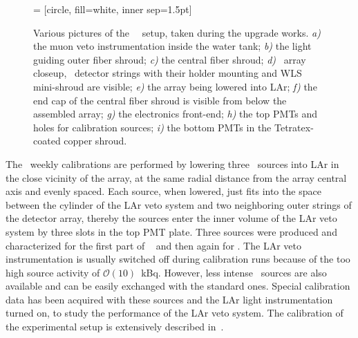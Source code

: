 \begin{figure}
   = [circle, fill=white, inner sep=1.5pt]
  \caption{%
    Various pictures of the \gerda\ \phasetwo\ setup, taken during the upgrade works.
    \emph{a)} the muon veto instrumentation inside the water tank; \emph{b)} the light
    guiding outer fiber shroud; \emph{c)} the central fiber shroud; \emph{d)} \phasetwo\
    array closeup, \bege\ detector strings with their holder mounting and WLS mini-shroud
    are visible; \emph{e)} the array being lowered into LAr; \emph{f)} the end cap of the
    central fiber shroud is visible from below the assembled array; \emph{g)} the
    electronics front-end; \emph{h)} the top PMTs and holes for calibration sources;
    \emph{i)} the bottom PMTs in the Tetratex\reg-coated copper shroud.
  }\label{fig:setup:pictures}
\end{figure}

The \gerda\ weekly calibrations are performed by lowering three \Th\ sources into LAr in
the close vicinity of the array, at the same radial distance from the array central axis
and evenly spaced. Each source, when lowered, just fits into the space between the
cylinder of the LAr veto system and two neighboring outer strings of the detector array,
thereby the sources enter the inner volume of the LAr veto system by three slots in the
top PMT plate.  Three sources were produced and characterized for the first part of
\phasetwo~\cite{Baudis2015} and then again for \phasetwop. The LAr veto instrumentation is
usually switched off during calibration runs because of the too high source activity of
$\mathcal{O}(10)$~kBq.  However, less intense \Ra\ sources are also available and can be
easily exchanged with the standard ones. Special calibration data has been acquired with
these sources and the LAr light instrumentation turned on, to study the performance of the
LAr veto system. The calibration of the experimental setup is extensively described
in~\cite{calib-paper}.

